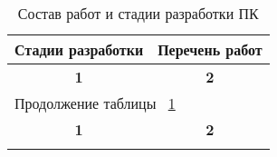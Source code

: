 \begin{center}
\begin{longtable}{|l|l|}
\caption{Состав работ и стадии разработки ПК} \label{tab:eco1} \\ \hline
\multicolumn{1}{|c|}{\textbf{Стадии разработки}}    &   \multicolumn{1}{c|}{\textbf{Перечень работ}} \\ \hline
\multicolumn{1}{|c|}{\textbf{1}}    &   \multicolumn{1}{|c|}{\textbf{2}} \\ \hline
\endfirsthead

\multicolumn{2}{|l|}{{Продолжение таблицы ~\ref{tab:eco1}}} \\ %
\hline \multicolumn{1}{|c|}{\textbf{1}} &
\multicolumn{1}{c|}{\textbf{2}} \\ \hline 
\endhead

\endfoot


\end{longtable}
\end{center}
